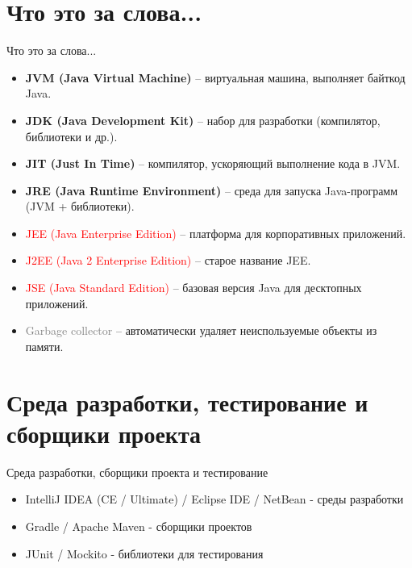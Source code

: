 \documentclass{beamer}
\begin{document}
\section{Что это за слова...}
\begin{frame}{Что это за слова...}
    \begin{itemize}
        \item \textcolor[rgb]{0.0, 0.5, 0.0}{\textbf{JVM (Java Virtual Machine)}} – виртуальная машина, выполняет байткод Java.
        \item \textcolor[rgb]{0.0, 0.5, 0.0}{\textbf{JDK (Java Development Kit)}} – набор для разработки (компилятор, библиотеки и др.).
        \item \textcolor[rgb]{0.0, 0.5, 0.0}{\textbf{JIT (Just In Time)}} – компилятор, ускоряющий выполнение кода в JVM.
        \item \textcolor[rgb]{0.0, 0.5, 0.0}{\textbf{JRE (Java Runtime Environment)}} – среда для запуска Java-программ (JVM + библиотеки).
        \item \textcolor{red}{JEE (Java Enterprise Edition)} – платформа для корпоративных приложений.
        \item \textcolor{red}{J2EE (Java 2 Enterprise Edition)} – старое название JEE.
        \item \textcolor{red}{JSE (Java Standard Edition)} – базовая версия Java для десктопных приложений.
        \item \textcolor{gray}{Garbage collector} – автоматически удаляет неиспользуемые объекты из памяти.
    \end{itemize}
\end{frame}

\section{Среда разработки, тестирование и сборщики проекта}
\begin{frame}{Среда разработки, сборщики проекта и тестирование}
    \begin{itemize}
        \item \textcolor[rgb]{0.0, 0.5, 0.0}{IntelliJ IDEA} (CE / \textcolor[rgb]{0.0, 0.5, 0.0}{Ultimate}) / Eclipse IDE / NetBean - среды разработки
        \item \textcolor[rgb]{0.0, 0.5, 0.0}{Gradle} / Apache Maven - сборщики проектов 
        \item \textcolor[rgb]{0.0, 0.5, 0.0}{JUnit} / Mockito - библиотеки для тестирования
    \end{itemize}
\end{frame}
\end{document}

